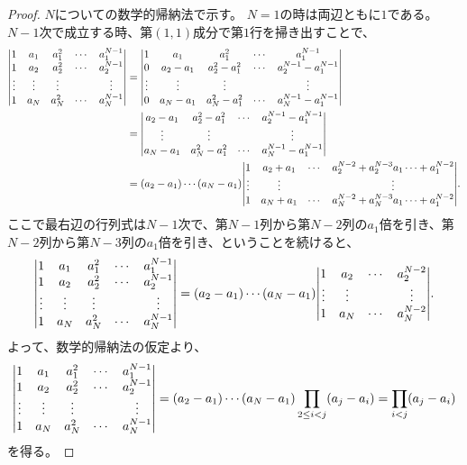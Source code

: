 \begin{proof}
$N$についての数学的帰納法で示す。
$N = 1$の時は両辺ともに$1$である。
$N-1$次で成立する時、第$(1, 1)$成分で第$1$行を掃き出すことで、
$$
\begin{aligned}
\mqty|
1 & a_1 & a_1^2 & \cdots & a_1^{N-1} \\
1 & a_2 & a_2^2 & \cdots & a_2^{N-1} \\
\vdots & \vdots & \vdots & & \vdots \\
1 & a_N & a_N^2 & \cdots & a_N^{N-1} \\
|
&=
\mqty|
1 & a_1 & a_1^2 & \cdots & a_1^{N-1} \\
0 & a_2-a_1 & a_2^2-a_1^2 & \cdots & a_2^{N-1}-a_1^{N-1} \\
\vdots & \vdots & \vdots & & \vdots \\
0 & a_N-a_1 & a_N^2-a_1^2 & \cdots & a_N^{N-1}-a_1^{N-1} \\
| \\
&=
\mqty|
a_2-a_1 & a_2^2-a_1^2 & \cdots & a_2^{N-1}-a_1^{N-1} \\
\vdots & \vdots & & \vdots \\
a_N-a_1 & a_N^2-a_1^2 & \cdots & a_N^{N-1}-a_1^{N-1} \\
| \\
&=
(a_2-a_1)\cdots(a_N-a_1)\mqty|
1 & a_2+a_1 & \cdots & a_2^{N-2}+a_2^{N-3}a_1\cdots+a_1^{N-2} \\
\vdots & \vdots & & \vdots \\
1 & a_N+a_1 & \cdots & a_N^{N-2}+a_N^{N-3}a_1\cdots+a_1^{N-2} \\
|.
\end{aligned}
$$
ここで最右辺の行列式は$N-1$次で、第$N-1$列から第$N-2$列の$a_1$倍を引き、第$N-2$列から第$N-3$列の$a_1$倍を引き、ということを続けると、
$$
\mqty|
1 & a_1 & a_1^2 & \cdots & a_1^{N-1} \\
1 & a_2 & a_2^2 & \cdots & a_2^{N-1} \\
\vdots & \vdots & \vdots & & \vdots \\
1 & a_N & a_N^2 & \cdots & a_N^{N-1} \\
|
=
(a_2-a_1)\cdots(a_N-a_1)\mqty|
1 & a_2 & \cdots & a_2^{N-2} \\
\vdots & \vdots & & \vdots \\
1 & a_N & \cdots & a_N^{N-2} \\
|.
$$
よって、数学的帰納法の仮定より、
$$
\mqty|
1 & a_1 & a_1^2 & \cdots & a_1^{N-1} \\
1 & a_2 & a_2^2 & \cdots & a_2^{N-1} \\
\vdots & \vdots & \vdots & & \vdots \\
1 & a_N & a_N^2 & \cdots & a_N^{N-1} \\
|
= (a_2-a_1)\cdots(a_N-a_1)\prod_{2 \le i < j}(a_j -a_i)
= \prod_{i < j}(a_j -a_i)
$$
を得る。
\end{proof}

